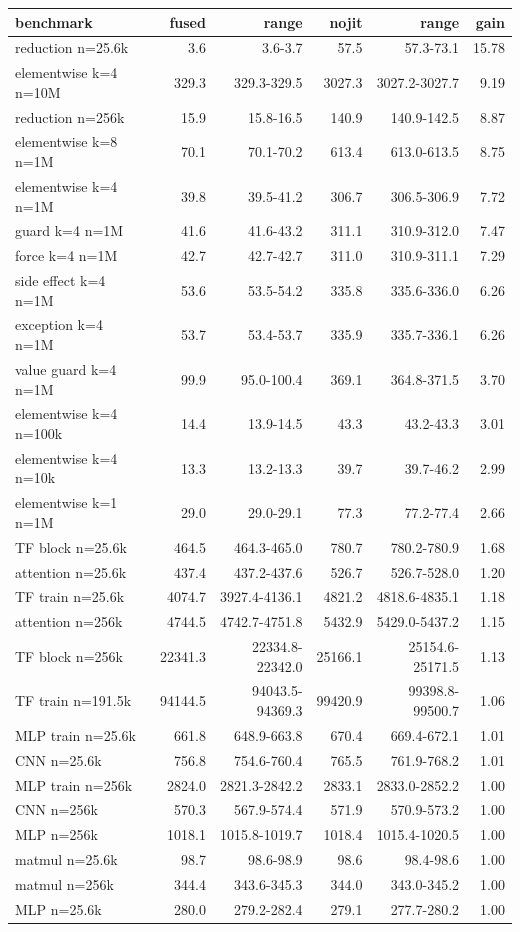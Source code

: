 \begin{tabular}{lrrrrr}
\toprule
benchmark & fused & range & nojit & range & gain \\
\midrule
reduction n=25.6k & 3.6 & 3.6-3.7 & 57.5 & 57.3-73.1 & 15.78 \\
elementwise k=4 n=10M & 329.3 & 329.3-329.5 & 3027.3 & 3027.2-3027.7 & 9.19 \\
reduction n=256k & 15.9 & 15.8-16.5 & 140.9 & 140.9-142.5 & 8.87 \\
elementwise k=8 n=1M & 70.1 & 70.1-70.2 & 613.4 & 613.0-613.5 & 8.75 \\
elementwise k=4 n=1M & 39.8 & 39.5-41.2 & 306.7 & 306.5-306.9 & 7.72 \\
guard k=4 n=1M & 41.6 & 41.6-43.2 & 311.1 & 310.9-312.0 & 7.47 \\
force k=4 n=1M & 42.7 & 42.7-42.7 & 311.0 & 310.9-311.1 & 7.29 \\
side effect k=4 n=1M & 53.6 & 53.5-54.2 & 335.8 & 335.6-336.0 & 6.26 \\
exception k=4 n=1M & 53.7 & 53.4-53.7 & 335.9 & 335.7-336.1 & 6.26 \\
value guard k=4 n=1M & 99.9 & 95.0-100.4 & 369.1 & 364.8-371.5 & 3.70 \\
elementwise k=4 n=100k & 14.4 & 13.9-14.5 & 43.3 & 43.2-43.3 & 3.01 \\
elementwise k=4 n=10k & 13.3 & 13.2-13.3 & 39.7 & 39.7-46.2 & 2.99 \\
elementwise k=1 n=1M & 29.0 & 29.0-29.1 & 77.3 & 77.2-77.4 & 2.66 \\
TF block n=25.6k & 464.5 & 464.3-465.0 & 780.7 & 780.2-780.9 & 1.68 \\
attention n=25.6k & 437.4 & 437.2-437.6 & 526.7 & 526.7-528.0 & 1.20 \\
TF train n=25.6k & 4074.7 & 3927.4-4136.1 & 4821.2 & 4818.6-4835.1 & 1.18 \\
attention n=256k & 4744.5 & 4742.7-4751.8 & 5432.9 & 5429.0-5437.2 & 1.15 \\
TF block n=256k & 22341.3 & 22334.8-22342.0 & 25166.1 & 25154.6-25171.5 & 1.13 \\
TF train n=191.5k & 94144.5 & 94043.5-94369.3 & 99420.9 & 99398.8-99500.7 & 1.06 \\
MLP train n=25.6k & 661.8 & 648.9-663.8 & 670.4 & 669.4-672.1 & 1.01 \\
CNN n=25.6k & 756.8 & 754.6-760.4 & 765.5 & 761.9-768.2 & 1.01 \\
MLP train n=256k & 2824.0 & 2821.3-2842.2 & 2833.1 & 2833.0-2852.2 & 1.00 \\
CNN n=256k & 570.3 & 567.9-574.4 & 571.9 & 570.9-573.2 & 1.00 \\
MLP n=256k & 1018.1 & 1015.8-1019.7 & 1018.4 & 1015.4-1020.5 & 1.00 \\
matmul n=25.6k & 98.7 & 98.6-98.9 & 98.6 & 98.4-98.6 & 1.00 \\
matmul n=256k & 344.4 & 343.6-345.3 & 344.0 & 343.0-345.2 & 1.00 \\
MLP n=25.6k & 280.0 & 279.2-282.4 & 279.1 & 277.7-280.2 & 1.00 \\
\bottomrule
\end{tabular}
